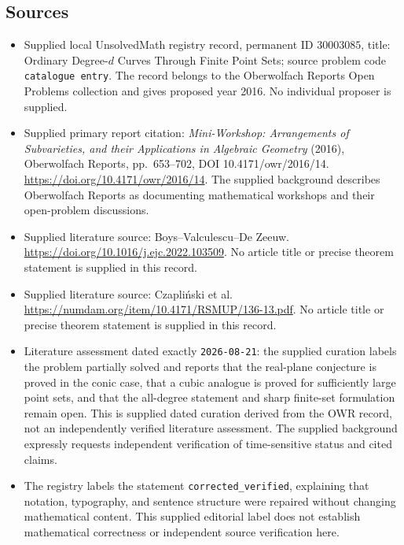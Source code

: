 \documentclass[11pt]{article}
\begin{document}
\subsection{Sources}
\begin{itemize}
\item Supplied local UnsolvedMath registry record, permanent ID \(30003085\), title: Ordinary Degree-\(d\) Curves Through Finite Point Sets; source problem code \texttt{catalogue entry}. The record belongs to the Oberwolfach Reports Open Problems collection and gives proposed year 2016. No individual proposer is supplied.
\item Supplied primary report citation: \emph{Mini-Workshop: Arrangements of Subvarieties, and their Applications in Algebraic Geometry} (2016), Oberwolfach Reports, pp.~653--702, DOI 10.4171/owr/2016/14. \url{https://doi.org/10.4171/owr/2016/14}. The supplied background describes Oberwolfach Reports as documenting mathematical workshops and their open-problem discussions.
\item Supplied literature source: Boys--Valculescu--De Zeeuw. \url{https://doi.org/10.1016/j.ejc.2022.103509}. No article title or precise theorem statement is supplied in this record.
\item Supplied literature source: Czapliński et al. \url{https://numdam.org/item/10.4171/RSMUP/136-13.pdf}. No article title or precise theorem statement is supplied in this record.
\item Literature assessment dated exactly \texttt{2026-08-21}: the supplied curation labels the problem partially solved and reports that the real-plane conjecture is proved in the conic case, that a cubic analogue is proved for sufficiently large point sets, and that the all-degree statement and sharp finite-set formulation remain open. This is supplied dated curation derived from the OWR record, not an independently verified literature assessment. The supplied background expressly requests independent verification of time-sensitive status and cited claims.
\item The registry labels the statement \texttt{corrected\_verified}, explaining that notation, typography, and sentence structure were repaired without changing mathematical content. This supplied editorial label does not establish mathematical correctness or independent source verification here.
\end{itemize}
\end{document}
